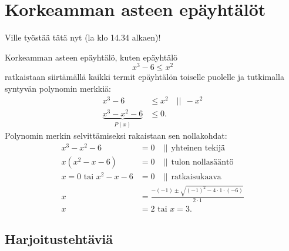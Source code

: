 \chapter{Korkeamman asteen epäyhtälöt}

Ville työstää tätä nyt (la klo 14.34 alkaen)!

Korkeamman asteen epäyhtälö, kuten epäyhtälö 
$$x^3 -6 \leq x^2 $$
ratkaistaan siirtämällä kaikki termit epäyhtälön toiselle puolelle ja tutkimalla
syntyvän polynomin merkkiä:
\begin{align*}
x^3 -6 &\leq x^2 \quad || \ \ -x^2 \\
\underbrace{x^3-x^2 -6}_{P(x)} &\leq 0.
\end{align*}
Polynomin merkin selvittämiseksi rakaistaan sen nollakohdat:
\begin{align*}
x^3 - x^2-6 &= 0 \quad || \ \ \textrm{yhteinen tekijä} \\
x(x^2 -x -6) &= 0 \quad || \ \ \textrm{tulon nollasääntö} \\
x = 0 \textrm{ tai } x^2 -x -6 &= 0 \quad|| \ \ \textrm{ratkaisukaava} \\
x &=\frac{-(-1) \pm \sqrt{(-1)^2-4\cdot 1 \cdot (-6)}}{2\cdot 1} \\
x &= 2 \textrm{ tai } x = 3.
\end{align*}

\section{Harjoitustehtäviä}
